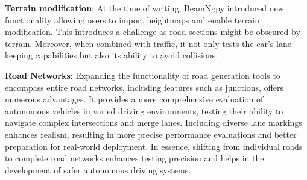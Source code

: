 \textbf{Terrain modification}: At the time of writing, BeamNgpy introduced new functionality allowing users to import heightmaps and enable terrain modification. This introduces a challenge as road sections might be obscured by terrain. Moreover, when combined with traffic, it not only tests the car's lane-keeping capabilities but also its ability to avoid collisions. 

\textbf{Road Networks}: Expanding the functionality of road generation tools to encompass entire road networks, including features such as junctions, offers numerous advantages. It provides a more comprehensive evaluation of autonomous vehicles in varied driving environments, testing their ability to navigate complex intersections and merge lanes. Including diverse lane markings enhances realism, resulting in more precise performance evaluations and better preparation for real-world deployment. In essence, shifting from individual roads to complete road networks enhances testing precision and helps in the development of safer autonomous driving systems.